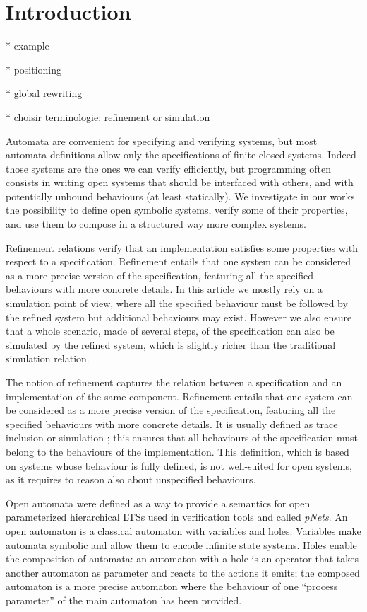 \documentclass[runningheads]{llncs}
\begin{document}
\section{Introduction}




* example

* positioning

* global rewriting

* choisir terminologie: refinement or simulation



Automata are convenient for specifying and verifying systems, but most automata definitions allow only the specifications of finite closed systems. Indeed those systems are the ones we can verify efficiently, but programming often consists in writing open systems that should be interfaced with others, and with potentially unbound behaviours (at least statically). We investigate in our works the possibility to define open symbolic systems, verify some of their properties, and use them to compose in a structured way more complex systems.


Refinement relations verify that an implementation satisfies some properties with respect to a specification. Refinement entails that one system can be considered as a more precise version of the specification, featuring all the specified behaviours with more concrete details. In this article we mostly rely on a simulation point of view, where all the specified behaviour must be followed by the refined system but additional behaviours may exist. However we also ensure that a whole scenario, made of several steps, of the specification can also be simulated by the refined system, which is slightly richer than the traditional simulation relation.


The notion of refinement  captures the relation between  a specification and an implementation of the same component. Refinement entails that one system can be considered as a more precise version of the specification, featuring all the specified behaviours with more concrete details. 
 It is usually defined as trace inclusion or simulation  \cite{Milner:1980,Kouchnarenko:2007}; this ensures that all behaviours of the specification must belong to the behaviours of the implementation. 
 This definition, which is based on systems whose behaviour is fully defined, is not well-suited for open systems,  as it requires to reason also about unspecified behaviours.


Open automata were defined as a way to provide a semantics for open parameterized hierarchical LTSs used in verification tools and called \emph{pNets}.
An open automaton \cite{henrio:01299562} is a classical automaton with variables and holes. Variables make automata symbolic and allow them to encode infinite state systems. Holes enable the composition of automata: an automaton with a hole is an operator that takes another automaton as parameter and reacts to the actions it emits; the composed automaton is a more precise automaton where the behaviour of one ``process parameter'' %
 of the main automaton has been provided.
\end{document}
